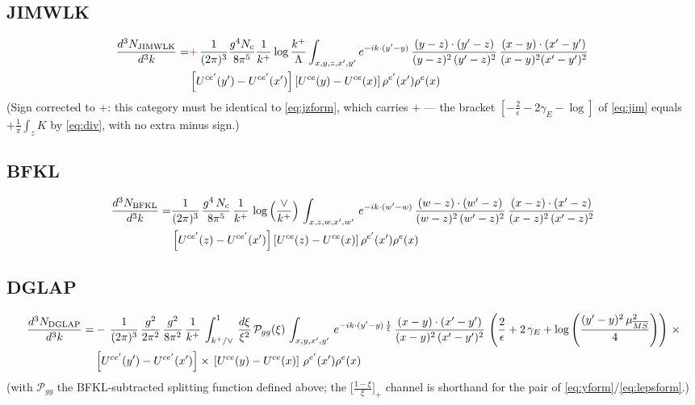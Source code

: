 \documentclass[9pt]{article}
\numberwithin{equation}{section}
\begin{document}
\subsection{JIMWLK}
\begin{align}
 \frac{d^{3}N_{\rm JIMWLK}}{d^{3}k} = &   {\color{red}+}\,\frac{1}{(2\pi)^{3}}\frac{g^{4}N_{c}}{8\pi^{5}}\frac{1}{k^{+}}\log\frac{k^{+}}{\Lambda}\int_{x,y,z,x',y'}e^{-ik\cdot(y'-y)}\,\frac{(y-z)\cdot (y'-z)}{(y-z)^{2}\,(y'-z)^{2}}\,\frac{(x-y)\cdot(x'-y')}{(x-y)^{2}(x'-y')^{2}}\,\notag \\ & \left[U^{ce'}(y')-U^{ce'}(x')\right]\left[U^{ce}(y)-U^{ce}(x)\right]\rho^{e'}(x')\rho^{e}(x)
\end{align}
{\color{red}(Sign corrected to $+$: this category must be identical to \eqref{eq:jzform},
which carries $+$ --- the bracket $[-\frac{2}{\epsilon}-2\gamma_{E}-\log]$ of \eqref{eq:jim}
equals $+\frac{1}{\pi}\int_{z}K$ by \eqref{eq:div}, with no extra minus sign.)}
\subsection{BFKL}
\begin{align}
    \frac{d^{3}N_{\rm BFKL}}{d^{3}k} = & \frac{1}{(2\pi)^{3}}\, \frac{g^{4}\,N_{c}}{8\pi^{5}}\,\frac{1}{k^{+}}\,\log{\left(\frac{\vee}{k^{+}}\right)}\,\int_{x,z,w,x',w'}\,e^{-ik\cdot (w'-w)}\,\frac{(w-z)\cdot (w'-z)}{(w-z)^{2}\,(w'-z)^{2}}\, \frac{(x-z)\cdot (x'-z)}{(x-z)^{2}\,(x'-z)^{2}}\notag \\ & \left[U^{ce'}(z)-U^{ce'}(x')\right]\left[U^{ce}(z)-U^{ce}(x)\right]\rho^{e'}(x')\rho^{e}(x)
\end{align}
\subsection{DGLAP}
\begin{align}
    \frac{d^{3}N_{\rm DGLAP}}{d^{3}k} = &   -\,\frac{1}{(2\pi)^{3}}\,\frac{g^{2}}{2\pi^{2}}\,\frac{g^{2}}{8\pi^{2}}\,\frac{1}{k^{+}}\,\int_{k^{+}/\vee}^{1}\, \frac{d\xi}{\xi^{2}}\,\mathcal{P}_{gg}(\xi)\,\int_{x,y,x',y'}\, e^{-ik\cdot (y'-y)\,\frac{1}{\xi}}\, \frac{(x-y)\cdot (x'-y')}{(x-y)^{2}\,(x'-y')^{2}}\,\left(\frac{2}{\epsilon}+2\,\gamma_{E}+\log{\left(\frac{(y'-y)^{2}\,\mu^{2}_{\overline{MS}}}{4}\right)}\right)\,\times\notag \\ &  \left[U^{ce'}(y') - U^{ce'}(x')\right] \times\, \left[U^{ce}(y) - U^{ce}(x)\right]\, \rho^{e'}(x') \rho^{e}(x)
\end{align}
{\color{red}(with $\mathcal P_{gg}$ the BFKL-subtracted splitting function defined above; the
$\big[\frac{1-\xi}{\xi}\big]_{+}$ channel is shorthand for the pair of
\eqref{eq:yform}/\eqref{eq:lepsform}.)}
\end{document}
